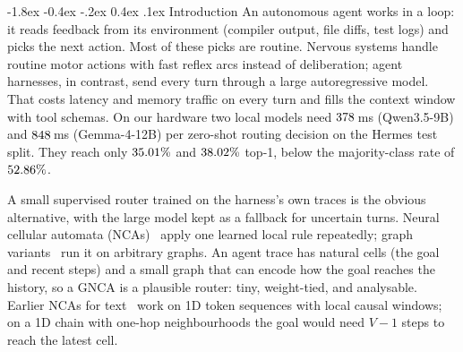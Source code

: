 \documentclass[10pt,twocolumn,letterpaper]{article}
\makeatletter
\renewcommand\section{\@startsection {section}{1}{\z@}%
  {-1.8ex \@plus -0.4ex \@minus -.2ex}%
  {0.4ex \@plus.1ex}%
  {\normalfont\normalsize\bfseries}}
\makeatother
\begin{document}
\section{Introduction}\label{sec:intro}
An autonomous agent works in a loop: it reads feedback from its environment (compiler output, file diffs, test logs) and picks the next action. Most of these picks are routine. Nervous systems handle routine motor actions with fast reflex arcs instead of deliberation; agent harnesses, in contrast, send every turn through a large autoregressive model. That costs latency and memory traffic on every turn and fills the context window with tool schemas. On our hardware two local models need $378$\,ms (Qwen3.5-9B) and $848$\,ms (Gemma-4-12B) per zero-shot routing decision on the Hermes test split. They reach only $35.01\%$ and $38.02\%$ top-1, below the majority-class rate of $52.86\%$.

A small supervised router trained on the harness's own traces is the obvious alternative, with the large model kept as a fallback for uncertain turns. Neural cellular automata (NCAs)~\cite{mordvintsev2020growing} apply one learned local rule repeatedly; graph variants~\cite{grattarola2021learning,gala2023equivariant} run it on arbitrary graphs. An agent trace has natural cells (the goal and recent steps) and a small graph that can encode how the goal reaches the history, so a GNCA is a plausible router: tiny, weight-tied, and analysable. Earlier NCAs for text~\cite{mittal2026textnca} work on 1D token sequences with local causal windows; on a 1D chain with one-hop neighbourhoods the goal would need $V{-}1$ steps to reach the latest cell.
\end{document}
